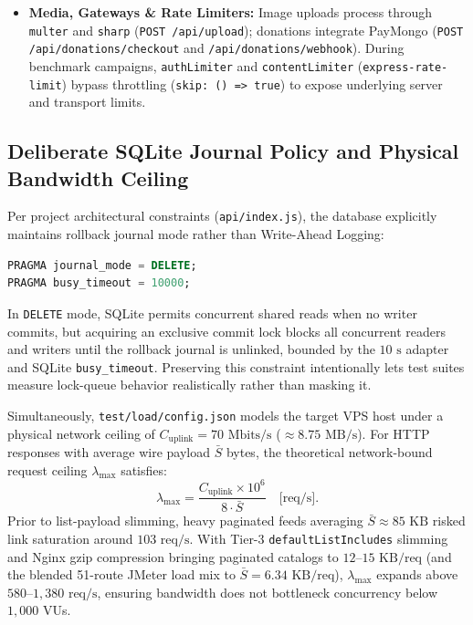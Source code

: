 \documentclass[11pt,letterpaper]{article}
\begin{document}
\begin{itemize}
  \item \textbf{Media, Gateways \& Rate Limiters:} Image uploads process through \texttt{multer} and \texttt{sharp} (\texttt{POST /\allowbreak api/\allowbreak upload}); donations integrate PayMongo (\texttt{POST /\allowbreak api/\allowbreak donations/\allowbreak checkout} and \texttt{/\allowbreak api/\allowbreak donations/\allowbreak webhook}). During benchmark campaigns, \texttt{authLimiter} and \texttt{contentLimiter} (\texttt{express-rate-limit}) bypass throttling (\texttt{skip: () => true}) to expose underlying server and transport limits.
\end{itemize}

\subsection{Deliberate SQLite Journal Policy and Physical Bandwidth Ceiling}
Per project architectural constraints (\texttt{api/index.js}), the database explicitly maintains rollback journal mode rather than Write-Ahead Logging:
\begin{lstlisting}[language=SQL,caption={Active SQLite concurrency pragmas initialized at backend startup (\texttt{api/index.js}).}]
PRAGMA journal_mode = DELETE;
PRAGMA busy_timeout = 10000;
\end{lstlisting}
In \texttt{DELETE} mode, SQLite permits concurrent shared reads when no writer commits, but acquiring an exclusive commit lock blocks all concurrent readers and writers until the rollback journal is unlinked, bounded by the $10\text{ s}$ adapter and SQLite \texttt{busy\_timeout}. Preserving this constraint intentionally lets test suites measure lock-queue behavior realistically rather than masking it.

Simultaneously, \texttt{test/load/config.json} models the target VPS host under a physical network ceiling of $C_{\text{uplink}} = 70\text{ Mbits/s}$ ($\approx 8.75\text{ MB/s}$). For HTTP responses with average wire payload $\bar{S}$ bytes, the theoretical network-bound request ceiling $\lambda_{\max}$ satisfies:
\begin{equation}
  \label{eq:bandwidth}
  \lambda_{\max} = \frac{C_{\text{uplink}} \times 10^{6}}{8 \cdot \bar{S}} \quad \text{[req/s]}.
\end{equation}
Prior to list-payload slimming, heavy paginated feeds averaging $\bar{S} \approx 85\text{ KB}$ risked link saturation around $103\text{ req/s}$. With Tier-3 \texttt{defaultListIncludes} slimming and Nginx gzip compression bringing paginated catalogs to $12\text{--}15\text{ KB/req}$ (and the blended 51-route JMeter load mix to $\bar{S} = 6.34\text{ KB/req}$), $\lambda_{\max}$ expands above $580\text{--}1{,}380\text{ req/s}$, ensuring bandwidth does not bottleneck concurrency below $1{,}000$ VUs.
\end{document}
